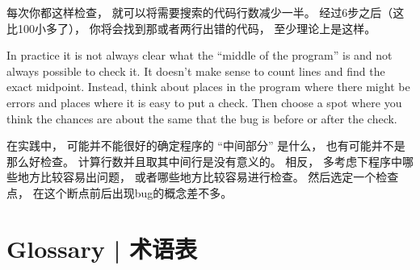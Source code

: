 每次你都这样检查， 就可以将需要搜索的代码行数减少一半。 经过6步之后（这比100小多了）， 你将会找到那或者两行出错的代码， 至少理论上是这样。

In practice it is not always clear what
the ``middle of the program'' is and not always possible to
check it.  It doesn't make sense to count lines and find the
exact midpoint.  Instead, think about places
in the program where there might be errors and places where it
is easy to put a check.  Then choose a spot where you
think the chances are about the same that the bug is before
or after the check.

在实践中， 可能并不能很好的确定程序的 ``中间部分'' 是什么， 也有可能并不是那么好检查。
计算行数并且取其中间行是没有意义的。 相反， 多考虑下程序中哪些地方比较容易出问题， 或者哪些地方比较容易进行检查。 然后选定一个检查点， 在这个断点前后出现bug的概念差不多。


\section{Glossary  |  术语表}

